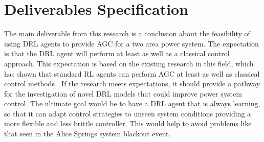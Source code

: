\section{Deliverables Specification}
The main deliverable from this research is a conclusion about the feasibility of using DRL agents to provide AGC for a two area power system. The expectation is that the DRL agent will perform at least as well as a classical control approach. This expectation is based on the existing research in this field, which has shown that standard RL agents can perform AGC at least as well as classical control methods \cite{Ahamed2002}. If the research meets expectations, it should provide a pathway for the investigation of novel DRL models that could improve power system control. The ultimate goal would be to have a DRL agent that is always learning, so that it can adapt control strategies to unseen system conditions providing a more flexible and less brittle controller. This would help to avoid problems like that seen in the Alice Springs system blackout event.